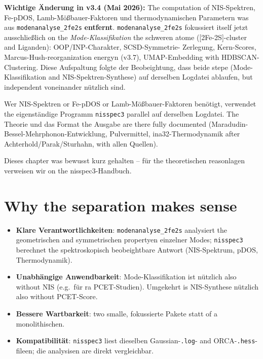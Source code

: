 \documentclass[11pt,a4paper,twoside]{article}
\theoremstyle{remark}
\begin{document}
\begin{infobox}
\textbf{Wichtige \"Anderung in v3.4 (Mai 2026):}
The computation of NIS-Spektren, Fe-pDOS, Lamb-M\"o\ss bauer-Faktoren
und thermodynamischen Parametern was aus \texttt{modenanalyse\_2fe2s}
\textbf{entfernt}. \texttt{modenanalyse\_2fe2s} fokussiert itself jetzt
ausschlie\ss lich on the \emph{Mode-Klassifikation} the schweren atome
([2Fe-2S]-cluster and Liganden): OOP/INP-Charakter, SCSD-Symmetrie-
Zerlegung, Kern-Scores, Marcus-Hush-reorganization energyn (v3.7),
UMAP-Embedding with HDBSCAN-Clustering. Diese Aufspaltung folgte der
Beobeightung, dass beide stepe
(Mode-Klassifikation and NIS-Spektren-Synthese) auf derselben Logdatei
ablaufen, but independent voneinander n\"utzlich sind.

Wer NIS-Spektren or Fe-pDOS or Lamb-M\"o\ss bauer-Faktoren ben\"otigt,
verwendet the eigenst\"andige Programm \texttt{nisspec3}
\cite{NisspecHandbuch} parallel auf derselben Logdatei. The Theorie und
das Format the Ausgabe are there fully documented
(Maradudin-Bessel-Mehrphonon-Entwicklung, Pulvermittel,
ina32-Thermodynamik after Achterhold/Parak/Sturhahn, with allen Quellen).

Dieses chapter was bewusst kurz gehalten -- f\"ur the theoretischen
reasonlagen verweisen wir on the nisspec3-Handbuch.
\end{infobox}

\section{Why the separation makes sense}

\begin{itemize}
  \item \textbf{Klare Verantwortlichkeiten}: \texttt{modenanalyse\_2fe2s}
        analysiert the geometrischen and symmetrischen propertyen
        einzelner Modes; \texttt{nisspec3} berechnet the spektroskopisch
        beobeightbare Antwort (NIS-Spektrum, pDOS, Thermodynamik).
  \item \textbf{Unabh\"angige Anwendbarkeit}: Mode-Klassifikation ist
        n\"utzlich also without NIS (e.g.\ f\"ur ra PCET-Studien).
        Umgekehrt is NIS-Synthese n\"utzlich also without PCET-Score.
  \item \textbf{Bessere Wartbarkeit}: two smalle, fokussierte Pakete
        statt of a monolithischen.
  \item \textbf{Kompatibilit\"at}: \texttt{nisspec3} liest dieselben
        Gaussian-\texttt{.log}- and ORCA-\texttt{.hess}-fileen; die
        analysisen are direkt vergleichbar.
\end{itemize}
\end{document}
